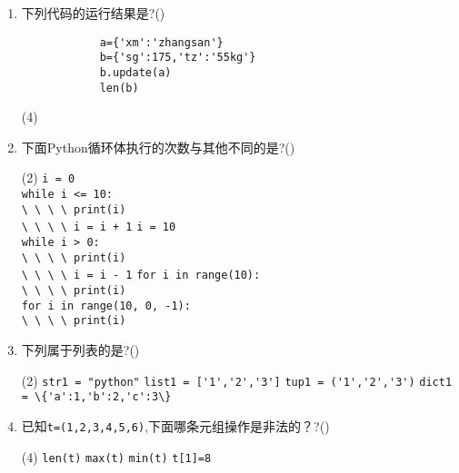 \documentclass[11pt]{ctexart}
\begin{document}
\begin{enumerate}
        \item 下列代码的运行结果是?(\qquad)
        \begin{lstlisting}
            a={'xm':'zhangsan'}
            b={'sg':175,'tz':'55kg'}
            b.update(a)
            len(b)
        \end{lstlisting}
        \begin{tasks}(4)
        \end{tasks}

        \item 下面Python循环体执行的次数与其他不同的是?(\qquad)
        \begin{tasks}(2)
            \task \lstinline{i = 0}\\
            \lstinline{while i <= 10:}\\
            \lstinline{\ \ \ \ print(i)}\\
            \lstinline{\ \ \ \ i = i + 1}
            \task \lstinline{i = 10}\\
            \lstinline{while i > 0:}\\
            \lstinline{\ \ \ \ print(i)}\\
            \lstinline{\ \ \ \ i = i - 1}
            \task \lstinline{for i in range(10):}\\
            \lstinline{\ \ \ \ print(i)}\\
            \task \lstinline{for i in range(10, 0, -1):}\\
            \lstinline{\ \ \ \ print(i)}\\
        \end{tasks}

        \item 下列属于列表的是?(\qquad)
        \begin{tasks}(2)
            \task \lstinline!str1 = "python"!
            \task \lstinline!list1 = ['1','2','3']!
            \task \lstinline!tup1 = ('1','2','3')!
            \task \lstinline!dict1 = \{'a':1,'b':2,'c':3\}!
        \end{tasks}

        \item 已知\lstinline!t=(1,2,3,4,5,6)!,下面哪条元组操作是非法的？?(\qquad)
        \begin{tasks}(4)
            \task \lstinline!len(t)!
            \task \lstinline!max(t)!
            \task \lstinline!min(t)!
            \task \lstinline!t[1]=8!
        \end{tasks}


\end{enumerate}
\end{document}
